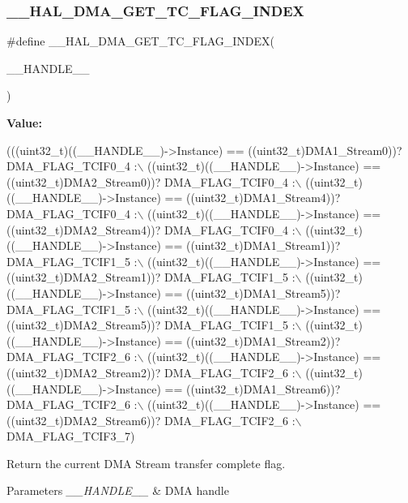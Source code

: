 \subsubsection{\texorpdfstring{\+\_\+\+\_\+\+H\+A\+L\+\_\+\+D\+M\+A\+\_\+\+G\+E\+T\+\_\+\+T\+C\+\_\+\+F\+L\+A\+G\+\_\+\+I\+N\+D\+EX}{\_\_HAL\_DMA\_GET\_TC\_FLAG\_INDEX}}
{\footnotesize\ttfamily \#define \+\_\+\+\_\+\+H\+A\+L\+\_\+\+D\+M\+A\+\_\+\+G\+E\+T\+\_\+\+T\+C\+\_\+\+F\+L\+A\+G\+\_\+\+I\+N\+D\+EX(\begin{DoxyParamCaption}\item[{}]{\+\_\+\+\_\+\+H\+A\+N\+D\+L\+E\+\_\+\+\_\+ }\end{DoxyParamCaption})}

{\bfseries Value\+:}
\begin{DoxyCode}
(((uint32\_t)((\_\_HANDLE\_\_)->Instance) == ((uint32\_t)DMA1\_Stream0))? DMA\_FLAG\_TCIF0\_4 :\(\backslash\)
 ((uint32\_t)((\_\_HANDLE\_\_)->Instance) == ((uint32\_t)DMA2\_Stream0))? DMA\_FLAG\_TCIF0\_4 :\(\backslash\)
 ((uint32\_t)((\_\_HANDLE\_\_)->Instance) == ((uint32\_t)DMA1\_Stream4))? DMA\_FLAG\_TCIF0\_4 :\(\backslash\)
 ((uint32\_t)((\_\_HANDLE\_\_)->Instance) == ((uint32\_t)DMA2\_Stream4))? DMA\_FLAG\_TCIF0\_4 :\(\backslash\)
 ((uint32\_t)((\_\_HANDLE\_\_)->Instance) == ((uint32\_t)DMA1\_Stream1))? DMA\_FLAG\_TCIF1\_5 :\(\backslash\)
 ((uint32\_t)((\_\_HANDLE\_\_)->Instance) == ((uint32\_t)DMA2\_Stream1))? DMA\_FLAG\_TCIF1\_5 :\(\backslash\)
 ((uint32\_t)((\_\_HANDLE\_\_)->Instance) == ((uint32\_t)DMA1\_Stream5))? DMA\_FLAG\_TCIF1\_5 :\(\backslash\)
 ((uint32\_t)((\_\_HANDLE\_\_)->Instance) == ((uint32\_t)DMA2\_Stream5))? DMA\_FLAG\_TCIF1\_5 :\(\backslash\)
 ((uint32\_t)((\_\_HANDLE\_\_)->Instance) == ((uint32\_t)DMA1\_Stream2))? DMA\_FLAG\_TCIF2\_6 :\(\backslash\)
 ((uint32\_t)((\_\_HANDLE\_\_)->Instance) == ((uint32\_t)DMA2\_Stream2))? DMA\_FLAG\_TCIF2\_6 :\(\backslash\)
 ((uint32\_t)((\_\_HANDLE\_\_)->Instance) == ((uint32\_t)DMA1\_Stream6))? DMA\_FLAG\_TCIF2\_6 :\(\backslash\)
 ((uint32\_t)((\_\_HANDLE\_\_)->Instance) == ((uint32\_t)DMA2\_Stream6))? DMA\_FLAG\_TCIF2\_6 :\(\backslash\)
   DMA\_FLAG\_TCIF3\_7)
\end{DoxyCode}


Return the current D\+MA Stream transfer complete flag. 


\begin{DoxyParams}{Parameters}
{\em \+\_\+\+\_\+\+H\+A\+N\+D\+L\+E\+\_\+\+\_\+} & D\+MA handle \\
\hline
\end{DoxyParams}

